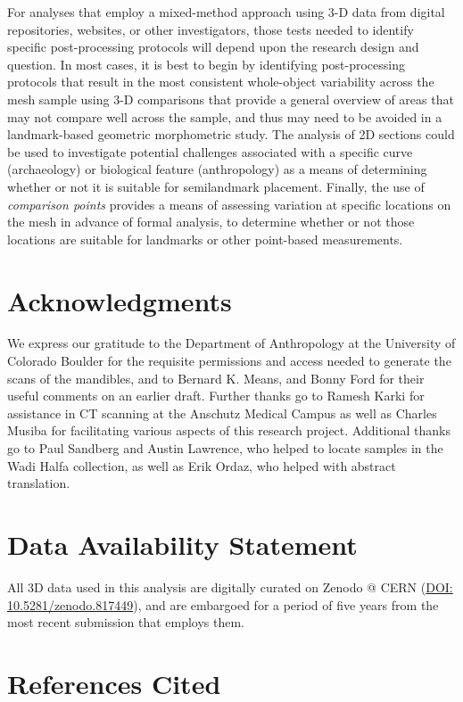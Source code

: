 \documentclass[review]{elsarticle}
\begin{document}
For analyses that employ a mixed-method approach using 3-D data from digital repositories, websites, or other investigators, those tests needed to identify specific post-processing protocols will depend upon the research design and question. In most cases, it is best to begin by identifying post-processing protocols that result in the most consistent whole-object variability across the mesh sample using 3-D comparisons that provide a general overview of areas that may not compare well across the sample, and thus may need to be avoided in a landmark-based geometric morphometric study. The analysis of 2D sections could be used to investigate potential challenges associated with a specific curve (archaeology) or biological feature (anthropology) as a means of determining whether or not it is suitable for semilandmark placement. Finally, the use of \textit{comparison points} provides a means of assessing variation at specific locations on the mesh in advance of formal analysis, to determine whether or not those locations are suitable for landmarks or other point-based measurements.

\section*{Acknowledgments}

We express our gratitude to the Department of Anthropology at the University of Colorado Boulder for the requisite permissions and access needed to generate the scans of the mandibles, and to Bernard K. Means, and Bonny Ford for their useful comments on an earlier draft. Further thanks go to Ramesh Karki for assistance in CT scanning at the Anschutz Medical Campus as well as Charles Musiba for facilitating various aspects of this research project. Additional thanks go to Paul Sandberg and Austin Lawrence, who helped to locate samples in the Wadi Halfa collection, as well as Erik Ordaz, who helped with abstract translation.

\section*{Data Availability Statement}

All 3D data used in this analysis are digitally curated on Zenodo @ CERN (\href{https://zenodo.org/record/817449}{DOI: 10.5281/zenodo.817449}), and are embargoed for a period of five years from the most recent submission that employs them.

\section*{References Cited}


\end{document}
